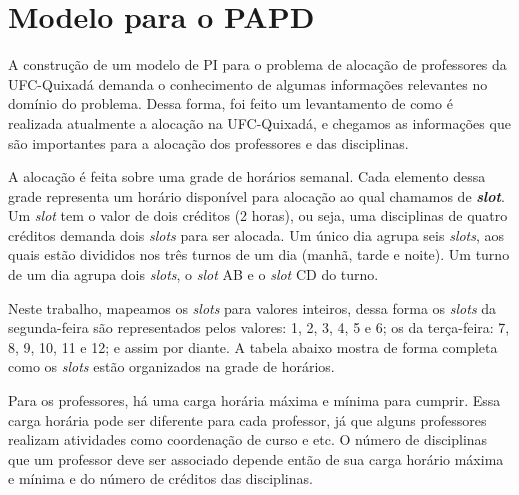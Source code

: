 \chapter{Modelo para o PAPD}
\label{cap:modelo-para-o-papd}

A construção de um modelo de PI para o problema de alocação de professores da UFC-Quixadá demanda o conhecimento de algumas informações relevantes no domínio do problema. Dessa forma, foi feito um levantamento de como é realizada atualmente a alocação na UFC-Quixadá, e chegamos as informações que são importantes para a alocação dos professores e das disciplinas. 

A alocação é feita sobre uma grade de horários semanal. Cada elemento dessa grade representa um horário disponível para alocação ao qual chamamos de \textbf{\textit{slot}}. Um \textit{slot} tem o valor de dois créditos (2 horas), ou seja, uma disciplinas de quatro créditos demanda dois \textit{slots} para ser alocada. Um único dia agrupa seis \textit{slots}, aos quais estão divididos nos três turnos de um dia (manhã, tarde e noite). Um turno de um dia agrupa dois \textit{slots}, o \textit{slot} AB e o \textit{slot} CD do turno. 

Neste trabalho, mapeamos os \textit{slots} para valores inteiros, dessa forma os \textit{slots} da segunda-feira são representados pelos valores: 1, 2, 3, 4, 5 e 6; os da terça-feira: 7, 8, 9, 10, 11 e 12; e assim por diante. A tabela abaixo mostra de forma completa como os \textit{slots} estão organizados na grade de horários.

\begin{figure}[htbp]
	\centering
\end{figure}


Para os professores, há uma carga horária máxima e mínima para cumprir. Essa carga horária pode ser diferente para cada professor, já que alguns professores realizam atividades como coordenação de curso e etc. O número de disciplinas que um professor deve ser associado depende então de sua carga horário máxima e mínima e do número de créditos das disciplinas. 

